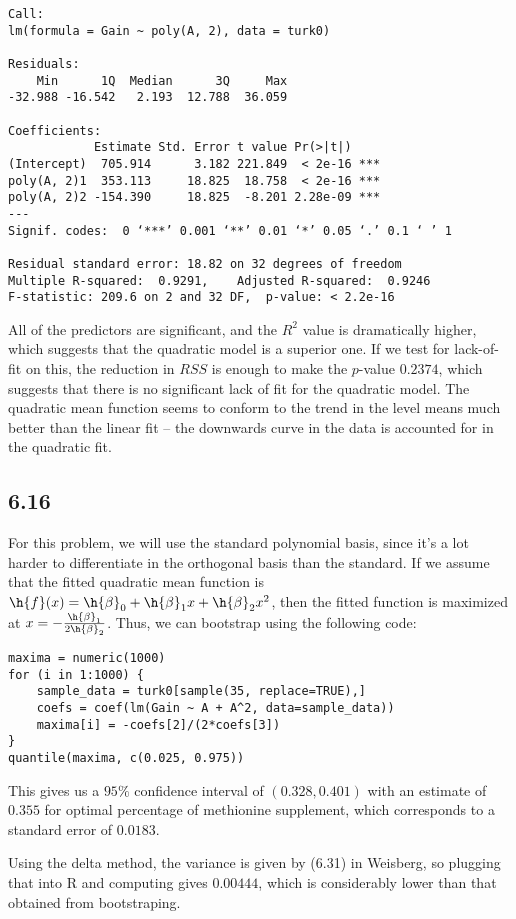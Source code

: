 \documentclass{article}
\begin{document}
\begin{verbatim}
Call:
lm(formula = Gain ~ poly(A, 2), data = turk0)

Residuals:
    Min      1Q  Median      3Q     Max 
-32.988 -16.542   2.193  12.788  36.059 

Coefficients:
            Estimate Std. Error t value Pr(>|t|)    
(Intercept)  705.914      3.182 221.849  < 2e-16 ***
poly(A, 2)1  353.113     18.825  18.758  < 2e-16 ***
poly(A, 2)2 -154.390     18.825  -8.201 2.28e-09 ***
---
Signif. codes:  0 ‘***’ 0.001 ‘**’ 0.01 ‘*’ 0.05 ‘.’ 0.1 ‘ ’ 1

Residual standard error: 18.82 on 32 degrees of freedom
Multiple R-squared:  0.9291,    Adjusted R-squared:  0.9246 
F-statistic: 209.6 on 2 and 32 DF,  p-value: < 2.2e-16
\end{verbatim}
All of the predictors are significant, and the $R^2$ value is dramatically higher, which suggests that the quadratic model is a superior one. If we test for lack-of-fit on this, the reduction in $RSS$ is enough to make the $p$-value $0.2374$, which suggests that there is no significant lack of fit for the quadratic model.
The quadratic mean function seems to conform to the trend in the level means much better than the linear fit -- the downwards curve in the data is accounted for in the quadratic fit.
\subsection*{6.16}
For this problem, we will use the standard polynomial basis, since it's a lot harder to differentiate in the orthogonal basis than the standard. If we assume that the fitted quadratic mean function is $\h{f}(x)=\h{\beta}_0+\h{\beta}_1x+\h{\beta}_2x^2$, then the fitted function is maximized at $x=-\frac{\h{\beta}_1}{2\h{\beta}_2}$. Thus, we can bootstrap using the following code:

\begin{verbatim}
maxima = numeric(1000)
for (i in 1:1000) {
    sample_data = turk0[sample(35, replace=TRUE),]
    coefs = coef(lm(Gain ~ A + A^2, data=sample_data))
    maxima[i] = -coefs[2]/(2*coefs[3])
}
quantile(maxima, c(0.025, 0.975))
\end{verbatim}

This gives us a $95\%$ confidence interval of $(0.328, 0.401)$ with an estimate of $0.355$ for optimal percentage of methionine supplement, which corresponds to a standard error of $0.0183$. 

Using the delta method, the variance is given by (6.31) in Weisberg, so plugging that into R and computing gives $0.00444$, which is considerably lower than that obtained from bootstraping.
\end{document}

